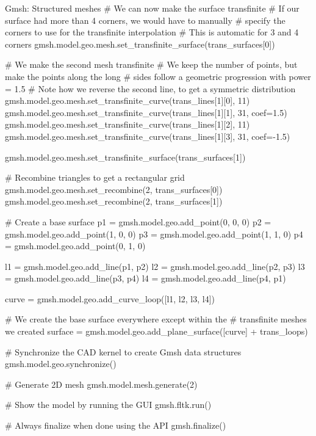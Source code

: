 \begin{python}[label=py:Gmshtransfinite, float=htp, breakable]{Gmsh: Structured meshes}
# We can now make the surface transfinite
# If our surface had more than 4 corners, we would have to manually
# specify the corners to use for the transfinite interpolation
# This is automatic for 3 and 4 corners
gmsh.model.geo.mesh.set_transfinite_surface(trans_surfaces[0])

# We make the second mesh transfinite
# We keep the number of points, but make the points along the long
# sides follow a geometric progression with power = 1.5
# Note how we reverse the second line, to get a symmetric distribution
gmsh.model.geo.mesh.set_transfinite_curve(trans_lines[1][0], 11)
gmsh.model.geo.mesh.set_transfinite_curve(trans_lines[1][1], 31,
                                          coef=1.5)
gmsh.model.geo.mesh.set_transfinite_curve(trans_lines[1][2], 11)
gmsh.model.geo.mesh.set_transfinite_curve(trans_lines[1][3], 31,
                                          coef=-1.5)

gmsh.model.geo.mesh.set_transfinite_surface(trans_surfaces[1])

# Recombine triangles to get a rectangular grid
gmsh.model.geo.mesh.set_recombine(2, trans_surfaces[0])
gmsh.model.geo.mesh.set_recombine(2, trans_surfaces[1])


# Create a base surface
p1 = gmsh.model.geo.add_point(0, 0, 0)
p2 = gmsh.model.geo.add_point(1, 0, 0)
p3 = gmsh.model.geo.add_point(1, 1, 0)
p4 = gmsh.model.geo.add_point(0, 1, 0)

l1 = gmsh.model.geo.add_line(p1, p2)
l2 = gmsh.model.geo.add_line(p2, p3)
l3 = gmsh.model.geo.add_line(p3, p4)
l4 = gmsh.model.geo.add_line(p4, p1)

curve = gmsh.model.geo.add_curve_loop([l1, l2, l3, l4])

# We create the base surface everywhere except within the
# transfinite meshes we created
surface = gmsh.model.geo.add_plane_surface([curve] + trans_loops)

# Synchronize the CAD kernel to create Gmsh data structures
gmsh.model.geo.synchronize()

# Generate 2D mesh
gmsh.model.mesh.generate(2)

# Show the model by running the GUI
gmsh.fltk.run()

# Always finalize when done using the API
gmsh.finalize()
\end{python}